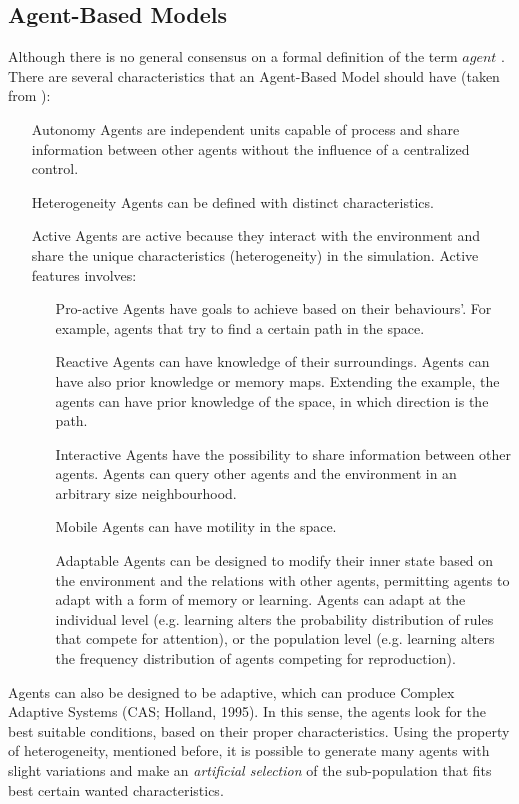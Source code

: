 \documentclass[fleqn,10pt]{SelfArx} %
\begin{document}
\subsection{Agent-Based Models}
Although there is no general consensus on a formal definition of the term $agent$ . There are several characteristics that an Agent-Based Model should have (taken from \citet{abm_prin_conc}):
\begin{itemize}
\item [Autonomy] Agents are independent units capable of process and share information between other agents without the influence of a centralized control.
\item [Heterogeneity] Agents can be defined with distinct characteristics.
\item [Active] Agents are active because they interact with the environment and share the unique characteristics (heterogeneity) in the simulation. Active features involves:
\begin{itemize}
\item[Pro-active]
Agents have goals to achieve based on their behaviours'. For example, agents that try to find a certain path in the space.
\item[Reactive]
Agents can have knowledge of their surroundings. Agents can have also prior knowledge or memory maps. Extending the example, the agents can have prior knowledge of the space, in which direction is the path.
\item[Interactive]
Agents have the possibility to share information between other agents. Agents can query other agents and the environment in an arbitrary size neighbourhood.
\item[Mobile]
Agents can have motility in the space.
\item[Adaptable]
Agents can be designed to modify their inner state based on the environment and the relations with other agents, permitting agents to adapt with a form of memory or learning. Agents can adapt at the individual level (e.g. learning alters the probability distribution of rules that compete for attention), or the population level (e.g. learning alters the frequency distribution of
agents competing for reproduction).

\end{itemize}


\end{itemize}
Agents can also be designed to be adaptive, which can produce Complex Adaptive Systems (CAS; Holland, 1995). In this sense, the agents look for the best suitable conditions, based on their proper characteristics. Using the property of heterogeneity, mentioned before, it is possible to generate many agents with slight variations and make an {\em artificial selection} of the sub-population that fits best certain wanted characteristics. 
\end{document}
